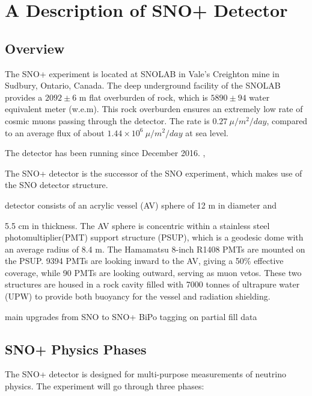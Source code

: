 


\section{A Description of SNO+ Detector}

\subsection{Overview}
The SNO+ experiment is located at SNOLAB in Vale's Creighton mine in Sudbury, Ontario, Canada. The deep underground facility of the SNOLAB provides a $2092\pm6$ m flat overburden of rock, which is $5890\pm94$ water equivalent meter (w.e.m). This rock overburden ensures an extremely low rate of cosmic muons passing through the detector. The rate is $0.27~\mu/m^2/day$, compared to an average flux of about $1.44\times 10^6~\mu/m^2/day$ at sea level\cite{muonflux}.





The detector has been running since December 2016.
\cite{anderson2019search},


The SNO+ detector is the successor of the SNO experiment, which makes use of the SNO detector structure. 


detector consists of an acrylic vessel (AV) sphere of 12 m in diameter and

5.5 cm in thickness. The AV sphere is concentric within a stainless steel photomultiplier(PMT) support structure (PSUP), which is a geodesic dome with an average radius of 8.4 m. The Hamamatsu 8-inch R1408 PMTs are mounted on the PSUP. 9394 PMTs are looking inward to the AV, giving a 50\% effective coverage, while 90 PMTs are looking outward, serving as muon vetos. These two structures are housed in a rock cavity filled with 7000 tonnes of ultrapure water (UPW) to provide both buoyancy for the vessel and radiation shielding.


main upgrades from SNO to SNO+
BiPo tagging on partial fill data

\subsection{SNO+ Physics Phases}
The SNO+ detector is designed for multi-purpose measurements of neutrino physics.
The experiment will go through three phases\cite{whitepaper}: 

